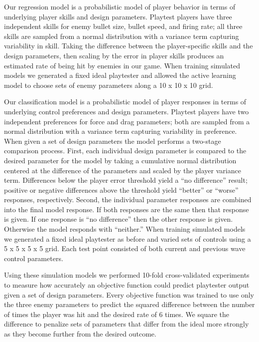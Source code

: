 \documentclass{sig-alternate}
\begin{document}


Our regression model is a probabilistic model of player behavior in terms of underlying player skills and design parameters.
Playtest players have three independent skills for enemy bullet size, bullet speed, and firing rate; all three skills are sampled from a normal distribution with a variance term capturing variability in skill.
Taking the difference between the player-specific skills and the design parameters, then scaling by the error in player skills produces an estimated rate of being hit by enemies in our game.
When training simulated models we generated a fixed ideal playtester and allowed the active learning model to choose sets of enemy parameters along a 10 x 10 x 10 grid.



Our classification model is a probabilistic model of player responses in terms of underlying control preferences and design parameters.
Playtest players have two independent preferences for force and drag parameters; both are sampled from a normal distribution with a variance term capturing variability in preference.
When given a set of design parameters the model performs a two-stage comparison process.
First, each individual design parameter is compared to the desired parameter for the model by taking a cumulative normal distribution centered at the difference of the parameters and scaled by the player variance term.
Differences below the player error threshold yield a ``no difference'' result; positive or negative differences above the threshold yield ``better'' or ``worse'' responses, respectively.
Second, the individual parameter responses are combined into the final model response.
If both responses are the same then that response is given.
If one response is ``no difference'' then the other response is given.
Otherwise the model responds with ``neither.''
When training simulated models we generated a fixed ideal playtester as before and varied sets of controls using a 5 x 5 x 5 x 5 grid.
Each test point consisted of both current and previous wave control parameters.



Using these simulation models we performed 10-fold cross-validated experiments to measure how accurately an objective function could predict playtester output given a set of design parameters.
Every objective function was trained to use only the three enemy parameters to predict the squared difference between the number of times the player was hit and the desired rate of 6 times.
We square the difference to penalize sets of parameters that differ from the ideal more strongly as they become further from the desired outcome.
\end{document}
